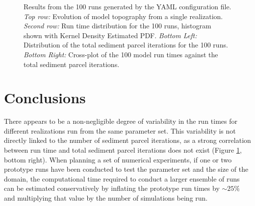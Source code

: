 \begin{figure}[!ht]
	\caption{Results from the 100 runs generated by the YAML configuration file. \textit{Top row:} Evolution of model topography from a single realization. \textit{Second row:} Run time distribution for the 100 runs, histogram shown with Kernel Density Estimated PDF. \textit{Bottom Left:} Distribution of the total sediment parcel iterations for the 100 runs. \textit{Bottom Right:} Cross-plot of the 100 model run times against the total sediment parcel iterations.}
	\label{fig:runtimes}
\end{figure}

\section{Conclusions}
There appears to be a non-negligible degree of variability in the run times for different realizations run from the same parameter set.
This variability is not directly linked to the number of sediment parcel iterations, as a strong correlation between run time and total sediment parcel iterations does not exist (Figure \ref{fig:runtimes}, bottom right).
When planning a set of numerical experiments, if one or two prototype runs have been conducted to test the parameter set and the size of the domain, the computational time required to conduct a larger ensemble of runs can be estimated conservatively by inflating the prototype run times by $\sim25\%$ and multiplying that value by the number of simulations being run.

\clearpage

